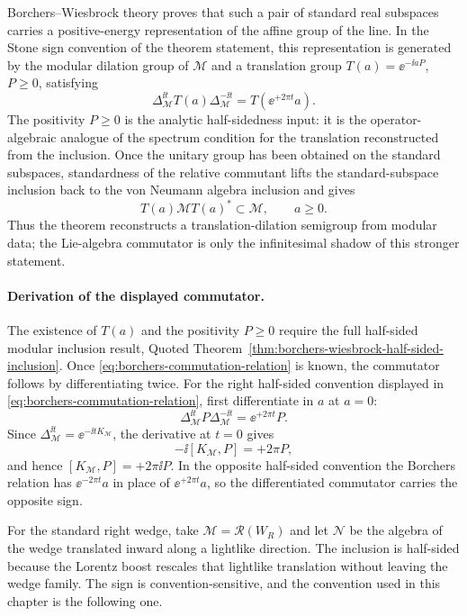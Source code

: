Borchers--Wiesbrock theory proves that such a pair of standard real subspaces
carries a positive-energy representation of the affine group of the line.  In
the Stone sign convention of the theorem statement, this representation is
generated by the modular dilation group of \(\mathcal M\) and a translation
group \(T(a)=\ee^{-\ii aP}\), \(P\ge0\), satisfying
\[
  \Delta_{\mathcal M}^{\ii t}T(a)\Delta_{\mathcal M}^{-\ii t}
  =
  T(\ee^{+2\pi t}a).
\]
The positivity \(P\ge0\) is the analytic half-sidedness input: it is the
operator-algebraic analogue of the spectrum condition for the translation
reconstructed from the inclusion.  Once the unitary group has been obtained
on the standard subspaces, standardness of the relative commutant lifts the
standard-subspace inclusion back to the von Neumann algebra inclusion and
gives
\[
  T(a)\mathcal M T(a)^*\subset\mathcal M,\qquad a\ge0 .
\]
Thus the theorem reconstructs a translation-dilation semigroup from modular
data; the Lie-algebra commutator is only the infinitesimal shadow of this
stronger statement.

\paragraph{Derivation of the displayed commutator.}
The existence of \(T(a)\) and the positivity \(P\ge0\) require the full
half-sided modular inclusion result, Quoted
Theorem~\ref{thm:borchers-wiesbrock-half-sided-inclusion}.  Once
\eqref{eq:borchers-commutation-relation} is known, the
commutator follows by differentiating twice.  For the right half-sided
convention displayed in \eqref{eq:borchers-commutation-relation}, first
differentiate in \(a\) at \(a=0\):
\[
  \Delta_{\mathcal M}^{\ii t}P\Delta_{\mathcal M}^{-\ii t}
  =
  \ee^{+2\pi t}P .
\]
Since \(\Delta_{\mathcal M}^{\ii t}=\ee^{-\ii tK_{\mathcal M}}\), the
derivative at \(t=0\) gives
\[
  -\ii[K_{\mathcal M},P]=+2\pi P,
\]
and hence \([K_{\mathcal M},P]=+2\pi\ii P\).  In the opposite half-sided
convention the Borchers relation has \(\ee^{-2\pi t}a\) in place of
\(\ee^{+2\pi t}a\), so the differentiated commutator carries the opposite
sign.

For the standard right wedge, take \(\mathcal M=\mathcal R(W_R)\) and let
\(\mathcal N\) be the algebra of the wedge translated inward along a lightlike
direction.  The inclusion is half-sided because the Lorentz boost rescales
that lightlike translation without leaving the wedge family.  The sign is
convention-sensitive, and the convention used in this chapter is the following
one.

